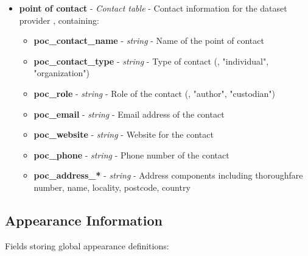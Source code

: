 \begin{itemize}
  \item \textbf{point of contact} - \textit{Contact table} - Contact information for the dataset provider \citep{cityjson_spec}, containing:
    \begin{itemize}
      \item \textbf{poc\_contact\_name} - \textit{string} - Name of the point of contact
      \item \textbf{poc\_contact\_type} - \textit{string} - Type of contact (\eg, "individual", "organization")
      \item \textbf{poc\_role} - \textit{string} - Role of the contact (\eg, "author", "custodian")
      \item \textbf{poc\_email} - \textit{string} - Email address of the contact
      \item \textbf{poc\_website} - \textit{string} - Website for the contact
      \item \textbf{poc\_phone} - \textit{string} - Phone number of the contact
      \item \textbf{poc\_address\_*} - \textit{string} - Address components including thoroughfare number, name, locality, postcode, country
    \end{itemize}
\end{itemize}


\subsection{Appearance Information}
\label{methodology:header:appearance}

Fields storing global appearance definitions:

